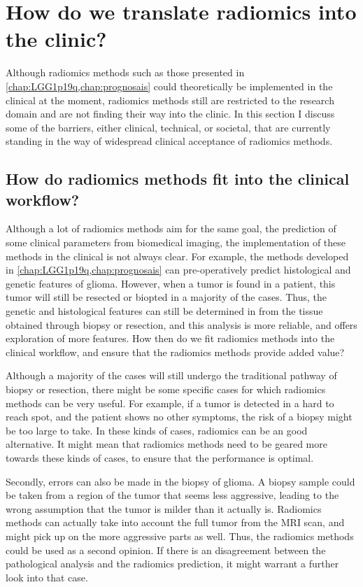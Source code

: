\section{How do we translate radiomics into the clinic?}\label{sec:discussion_clinical}

Although radiomics methods such as those presented in \cref{chap:LGG1p19q,chap:prognosais} could theoretically be implemented in the clinical at the moment, radiomics methods still are restricted to the research domain and are not finding their way into the clinic.
In this section I discuss some of the barriers, either clinical, technical, or societal, that are currently standing in the way of widespread clinical acceptance of radiomics methods.

\subsection{How do radiomics methods fit into the clinical workflow?}

Although a lot of radiomics methods aim for the same goal, the prediction of some clinical parameters from biomedical imaging, the implementation of these methods in the clinical is not always clear.
For example, the methods developed in \cref{chap:LGG1p19q,chap:prognosais} can pre-operatively predict histological and genetic features of glioma.
However, when a tumor is found in a patient, this tumor will still be resected or biopted in a majority of the cases.
Thus, the genetic and histological features can still be determined in from the tissue obtained through biopsy or resection, and this analysis is more reliable, and offers exploration of more features.
How then do we fit radiomics methods into the clinical workflow, and ensure that the radiomics methods provide added value?

Although a majority of the cases will still undergo the traditional pathway of biopsy or resection, there might be some specific cases for which radiomics methods can be very useful.
For example, if a \gls{tumor} is detected in a hard to reach spot, and the patient shows no other symptoms, the risk of a biopsy might be too large to take.
In these kinds of cases, radiomics can be an good alternative.
It might mean that radiomics methods need to be geared more towards these kinds of cases, to ensure that the performance is optimal.

Secondly, errors can also be made in the biopsy of glioma.
A biopsy sample could be taken from a region of the tumor that seems less aggressive, leading to the wrong assumption that the tumor is milder than it actually is.
Radiomics methods can actually take into account the full \gls{tumor} from the \gls{MRI} scan, and might pick up on the more aggressive parts as well.
Thus, the radiomics methods could be used as a second opinion.
If there is an disagreement between the pathological analysis and the radiomics prediction, it might warrant a further look into that case.

